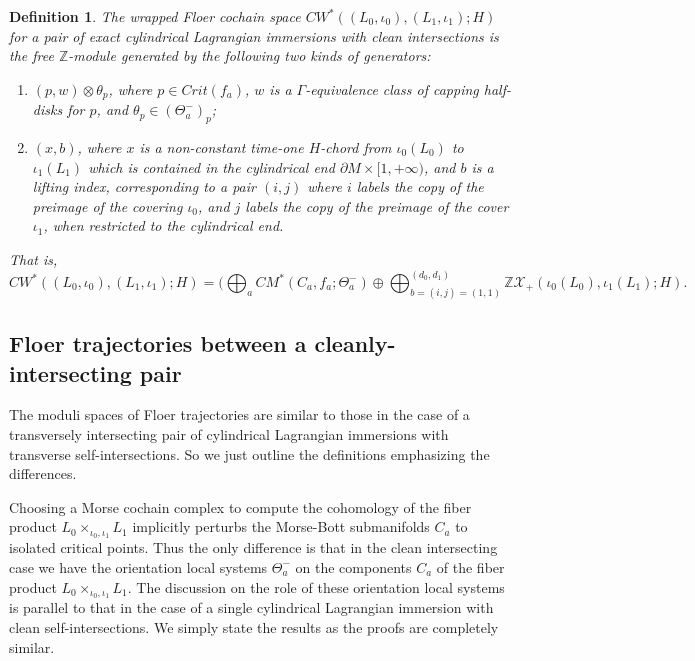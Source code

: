 \documentclass{amsart}
\newtheorem{definition}[theorem]{Definition}
\numberwithin{equation}{section}
\numberwithin{figure}{section}
\begin{document}
\begin{definition}
	The wrapped Floer cochain space $CW^{*}((L_{0}, \iota_{0}), (L_{1}, \iota_{1}); H)$ for a pair of exact cylindrical Lagrangian immersions with clean intersections is the free $\mathbb{Z}$-module generated by the following two kinds of generators:
\begin{enumerate}

\item $(p, w) \otimes \theta_{p}$, where $p \in Crit(f_{a})$, $w$ is a $\Gamma$-equivalence class of capping half-disks for $p$, and $\theta_{p} \in (\Theta_{a}^{-})_{p}$;

\item $(x, b)$, where $x$ is a non-constant time-one $H$-chord from $\iota_{0}(L_{0})$ to $\iota_{1}(L_{1})$ which is contained in the cylindrical end $\partial M \times [1, +\infty)$, and $b$ is a lifting index, corresponding to a pair $(i, j)$ where $i$ labels the copy of the preimage of the covering $\iota_{0}$, and $j$ labels the copy of the preimage of the cover $\iota_{1}$, when restricted to the cylindrical end.

\end{enumerate} \par
That is,
\begin{equation}
CW^{*}((L_{0}, \iota_{0}), (L_{1}, \iota_{1}); H) = (\bigoplus_{a}CM^{*}(C_{a}, f_{a}; \Theta_{a}^{-}) \oplus \bigoplus_{b = (i, j) = (1, 1)}^{(d_{0}, d_{1})} \mathbb{Z}\mathcal{X}_{+}(\iota_{0}(L_{0}), \iota_{1}(L_{1}); H).
\end{equation}
\end{definition}

\subsection{Floer trajectories between a cleanly-intersecting pair}
	The moduli spaces of Floer trajectories are similar to those in the case of a transversely intersecting pair of cylindrical Lagrangian immersions with transverse self-intersections. So we just outline the definitions emphasizing the differences. \par
	Choosing a Morse cochain complex to compute the cohomology of the fiber product $L_{0} \times_{\iota_{0}, \iota_{1}} L_{1}$ implicitly perturbs the Morse-Bott submanifolds $C_{a}$ to isolated critical points. Thus the only difference is that in the clean intersecting case we have the orientation local systems $\Theta_{a}^{-}$ on the components $C_{a}$ of the fiber product $L_{0} \times_{\iota_{0}, \iota_{1}} L_{1}$. The discussion on the role of these orientation local systems is parallel to that in the case of a single cylindrical Lagrangian immersion with clean self-intersections. We simply state the results as the proofs are completely similar. \par
\end{document}
